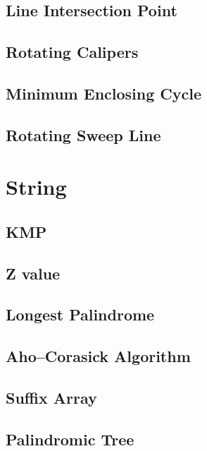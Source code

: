 \documentclass[a4paper,10pt,twocolumn,oneside]{article}
\begin{document}
\subsection{Line Intersection Point}


\subsection{Rotating Calipers}


\subsection{Minimum Enclosing Cycle}


\subsection{Rotating Sweep Line}


\section{String}

\subsection{KMP}

\subsection{Z value}

\subsection{Longest Palindrome}

\subsection{Aho–Corasick Algorithm}

\subsection{Suffix Array}

\subsection{Palindromic Tree}

\end{document}
